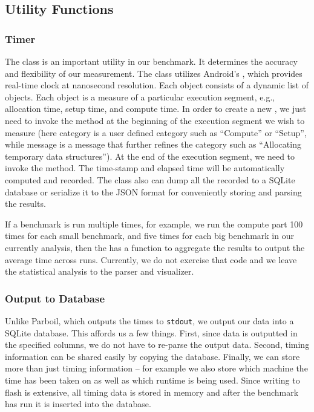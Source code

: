 \subsection{Utility Functions}
\subsubsection{Timer}
The  class is an important utility in our benchmark. It
determines the accuracy and flexibility of our measurement. The 
class utilizes Android's , which provides real-time clock at
nanosecond resolution. Each  object consists of a dynamic list of
 objects. Each  object is a measure of a
particular execution segment, e.g., allocation time, setup time, and compute
time. In order to create a new , we just need to invoke the
 method at the beginning of the execution
segment we wish to measure (here category is a user defined category such as
``Compute'' or ``Setup'', while message is a message that further refines the
category such as ``Allocating temporary data structures''). At the end of the
execution segment, we need to invoke the  method. The
time-stamp and elapsed time will be automatically computed and recorded.
The  class also can dump all the recorded  to a
SQLite database or serialize it to the JSON format for conveniently storing and
parsing the results.

If a benchmark is run multiple times, for example, we run the compute part 100
times for each small benchmark, and five times for each big benchmark in our
currently analysis, then the  has a function to aggregate the results
to output the average time across runs.  Currently, we do not exercise that code
and we leave the statistical analysis to the parser and visualizer.

\subsubsection{Output to Database}

Unlike Parboil, which outputs the times to {\tt stdout}, we output our data into
a SQLite database.  This affords us a few things.  First, since data is
outputted in the specified columns, we do not have to re-parse the output data.
Second, timing information can be shared easily by copying the database.
Finally, we can store more than just timing information -- for example we also
store which machine the time has been taken on as well as which runtime is being
used.  Since writing to flash is extensive, all timing data is stored in memory
and after the benchmark has run it is inserted into the database. 

